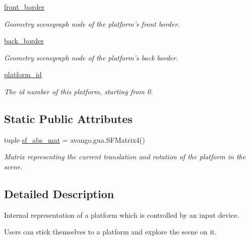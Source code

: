 \begin{DoxyCompactItemize}
\hyperlink{classlib_1_1Platform_1_1Platform_ab364263ccb3d2f0c7638573d5badcc3b}{front\-\_\-border}
\begin{DoxyCompactList}\small\item\em \-Geometry scenegraph node of the platform's front border. \end{DoxyCompactList}\item 
\hyperlink{classlib_1_1Platform_1_1Platform_ac2348d3e1d66bd5f18deb4d0b6e6ae95}{back\-\_\-border}
\begin{DoxyCompactList}\small\item\em \-Geometry scenegraph node of the platform's back border. \end{DoxyCompactList}\item 
\hyperlink{classlib_1_1Platform_1_1Platform_a417b1233b8dc4cac5ffb0cc8abd12d03}{platform\-\_\-id}
\begin{DoxyCompactList}\small\item\em \-The id number of this platform, starting from 0. \end{DoxyCompactList}\end{DoxyCompactItemize}
\subsection*{\-Static \-Public \-Attributes}
\begin{DoxyCompactItemize}
\item 
tuple \hyperlink{classlib_1_1Platform_1_1Platform_ab8bf653beb33de70371ae6984aeb516c}{sf\-\_\-abs\-\_\-mat} = avango.\-gua.\-S\-F\-Matrix4()
\begin{DoxyCompactList}\small\item\em \-Matrix representing the current translation and rotation of the platform in the scene. \end{DoxyCompactList}\end{DoxyCompactItemize}


\subsection{\-Detailed \-Description}
\-Internal representation of a platform which is controlled by an input device. 

\-Users can stick themselves to a platform and explore the scene on it. 

